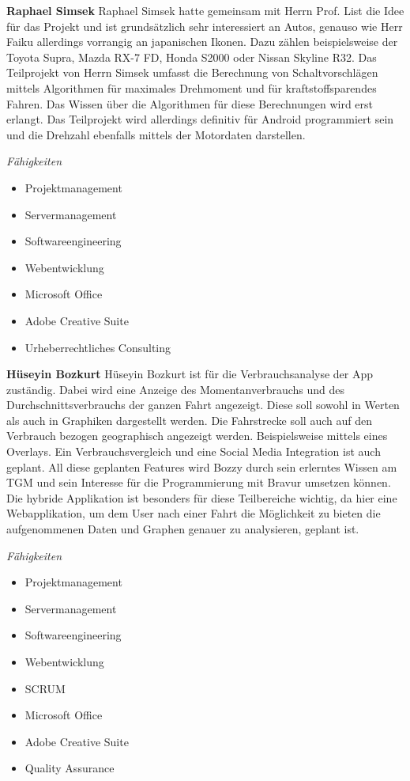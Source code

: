 \newpage

\textbf{Raphael Simsek}
Raphael Simsek hatte gemeinsam mit Herrn Prof. List die Idee für das Projekt und ist grundsätzlich sehr interessiert an Autos, genauso wie Herr Faiku allerdings vorrangig an japanischen Ikonen. Dazu zählen beispielsweise der Toyota Supra, Mazda RX-7 FD, Honda S2000 oder Nissan Skyline R32. Das Teilprojekt von Herrn Simsek umfasst die Berechnung von Schaltvorschlägen mittels Algorithmen für maximales Drehmoment und für kraftstoffsparendes Fahren. Das Wissen über die Algorithmen für diese Berechnungen wird erst erlangt. Das Teilprojekt wird allerdings definitiv für Android programmiert sein und die Drehzahl ebenfalls mittels der Motordaten darstellen.

\textit{Fähigkeiten}
\begin{itemize}
	\item Projektmanagement
	\item Servermanagement				
	\item Softwareengineering
	\item Webentwicklung
	\item Microsoft Office
	\item Adobe Creative Suite
	\item Urheberrechtliches Consulting
\end{itemize}

\textbf{Hüseyin Bozkurt}
Hüseyin Bozkurt ist für die Verbrauchsanalyse der App zuständig. Dabei wird eine Anzeige des Momentanverbrauchs und des Durchschnittsverbrauchs der ganzen Fahrt angezeigt. Diese soll sowohl in Werten als auch in Graphiken dargestellt werden. Die Fahrstrecke soll auch auf den Verbrauch bezogen geographisch angezeigt werden. Beispielsweise mittels eines Overlays. Ein Verbrauchsvergleich und eine Social Media Integration ist auch geplant.
All diese geplanten Features wird Bozzy durch sein erlerntes Wissen am TGM und sein Interesse für die Programmierung mit Bravur umsetzen können. Die hybride Applikation ist besonders für diese Teilbereiche wichtig, da hier eine Webapplikation, um dem User nach einer Fahrt die Möglichkeit zu bieten die aufgenommenen Daten und Graphen genauer zu analysieren, geplant ist.

\textit{Fähigkeiten}
\begin{itemize}
	\item Projektmanagement
	\item Servermanagement				
	\item Softwareengineering
	\item Webentwicklung
	\item SCRUM
	\item Microsoft Office
	\item Adobe Creative Suite
	\item Quality Assurance
\end{itemize}

